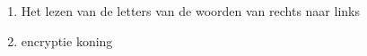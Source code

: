 \begin{enumerate}
  \item Het lezen van de letters van de woorden van rechts naar links
  \item encryptie koning
\end{enumerate}